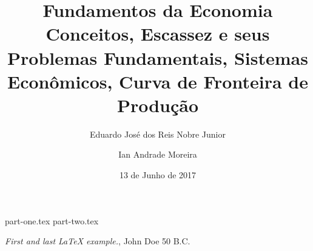 \documentclass[12pt, a4paper, titlepage]{article}
\title{Fundamentos da Economia \\ \normalsize Conceitos, Escassez e seus Problemas Fundamentais, Sistemas Econômicos, Curva de Fronteira de Produção\vspace{30ex}}
\author{Eduardo José dos Reis Nobre Junior \and Ian Andrade Moreira\vspace{30ex}}
\date{13 de Junho de 2017}
\begin{document}
  \maketitle
  \clearpage
  {part-one.tex}
  {part-two.tex}
  \begin{thebibliography}{9}
     \emph{First and last \LaTeX{} example.},
      John Doe 50 B.C.
  \end{thebibliography}
\end{document}
